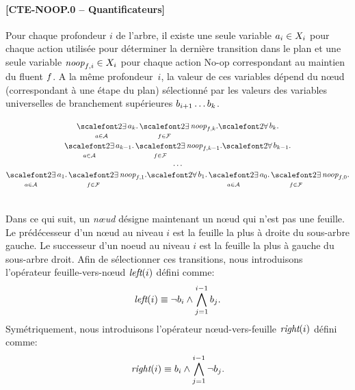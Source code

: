 \paragraph*{[CTE-NOOP.0 -- Quantificateurs]}

Pour chaque profondeur $i$ de l'arbre, %
il existe une seule variable $a_{i}\in X_{i}$ pour chaque action utilisée pour déterminer la dernière transition dans le plan et une seule variable $\textit{noop}_{f,i}\in X_{i}$ pour chaque action No-op correspondant au maintien du fluent $f$. A la même profondeur~$i$, la valeur de ces variables dépend du n\oe ud (correspondant à une étape du plan) sélectionné par les valeurs des variables universelles de branchement supérieures $b_{i+1}\ldots b_{k}$.

\begin{small}
\[
\begin{matrix}
\displaystyle \bigexists_{\a \in \A} \a_{\depth}. \bigexists_{\f\in \F} \noop{\f}{\depth}.%
\displaystyle {\bigforall b_{\depth}.}\\
\displaystyle \bigexists_{\a \in \A} \a_{\depth-1}. \bigexists_{\f\in \F} \noop{\f}{\depth-1}.%
\displaystyle {\bigforall b_{\depth-1}.}\\
\displaystyle \dots\\ 
\displaystyle \bigexists_{\a \in \A} \a_{1}. \bigexists_{\f\in \F} \noop{\f}{1}.%
\displaystyle {\bigforall b_{1}.}%
\displaystyle \bigexists_{\a \in \A} \a_{0}. \bigexists_{\f\in \F} \noop{\f}{0}.
\end{matrix}
\]
\end{small}\\

Dans ce qui suit, un \textit{n\oe ud} désigne maintenant un n\oe ud qui n'est pas une feuille. %
Le prédécesseur d'un n\oe ud au niveau $i$ est la feuille la plus à droite du sous-arbre gauche. Le successeur d'un noeud au niveau $i$ est la feuille la plus à gauche du sous-arbre droit.
Afin de sélectionner ces transitions, nous introduisons l'opérateur feuille-vers-n\oe ud $\textit{left}(i)$ défini comme:
\[\textit{left}(i) \equiv \neg b_{i} \wedge \bigwedge\limits_{\substack{j=1}}^{i-1} b_{j}.\]
Symétriquement, nous introduisons l'opérateur n\oe ud-vers-feuille $\textit{right}(i)$ défini comme:
\[\textit{right}(i) \equiv b_{i} \wedge \bigwedge\limits_{\substack{j=1}}^{i-1} \neg b_{j}.\]


